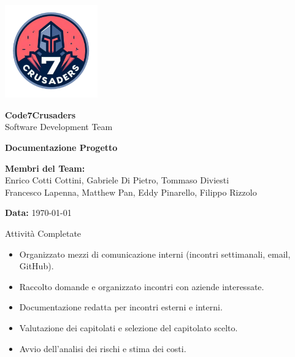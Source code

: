 \documentclass{beamer}
\begin{document}
\begin{frame}[plain] %
    \centering
    \vspace*{2cm}
    
    \includegraphics[width=0.3\textwidth]{../img/logo/7Crusaders_logo.png} %
    \vspace{1cm}
    
    {\Huge \textbf{Code7Crusaders}}\\
    \vspace{0.5cm}
    {\Large Software Development Team}\\
    \vspace{2cm}
    
    {\large \textbf{Documentazione Progetto}}\\
    \vspace{3cm}

    \textbf{Membri del Team:}\\
    Enrico Cotti Cottini, Gabriele Di Pietro, Tommaso Diviesti \\
    Francesco Lapenna, Matthew Pan, Eddy Pinarello, Filippo Rizzolo \\
    \vspace{1cm}
    
    {\large \textbf{Data:}} \today\\
    
    \vspace{1cm}
\end{frame}

\begin{frame}
    \begin{block}{Attività Completate}
        \begin{itemize}
            \item Organizzato mezzi di comunicazione interni (incontri settimanali, email, GitHub).
            \item Raccolto domande e organizzato incontri con aziende interessate.
            \item Documentazione redatta per incontri esterni e interni.
            \item Valutazione dei capitolati e selezione del capitolato scelto.
            \item Avvio dell'analisi dei rischi e stima dei costi.
        \end{itemize}
    \end{block}
\end{frame}
\end{document}
